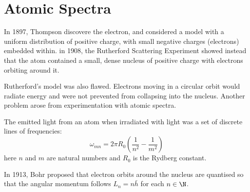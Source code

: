 \documentclass[../Main.tex]{subfiles}
\begin{document}
\section{Atomic Spectra}
In 1897, Thompson discovere the electron, and considered a model with a uniform distribution of positive charge, with small negative charges (electrons) embedded within. in 1908, the Rutherford Scattering Experiment showed instead that the atom contained a small, dense nucleus of positive charge with electrons orbiting around it.

Rutherford's model was also flawed. Electrons moving in a circular orbit would radiate energy and were not prevented from collapsing into the nucleus. Another problem arose from experimentation with atomic spectra.

The emitted light from an atom when irradiated with light was a set of discrete lines of frequencies:
\begin{equation}
    \omega_{mn} = 2\pi R_0 \left(\frac{1}{n^2} - \frac1{m^2}\right)
    \label{eqnAtomSpectra}
\end{equation}
here $n$ and $m$ are natural numbers and $R_0$ is the Rydberg constant.

In 1913, Bohr proposed that electron orbits around the nucleus are quantised so that the angular momentum follows $L_n = n \bar{h}$ for each $n \in \N$.

\begin{theorem}
    
    \label{thmQuantisation}
\end{theorem}
\end{document}
